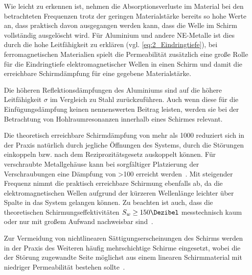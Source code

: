 Wie leicht zu erkennen ist, nehmen die Absorptionsverluste im Material bei den betrachteten Frequenzen trotz der geringen Materialstärke bereits so hohe Werte an, dass praktisch davon ausgegangen werden kann, dass die Welle im Schirm vollständig ausgelöscht wird. Für Aluminium und andere \ac{NE-Metalle} ist dies durch die hohe Leitfähigkeit zu erklären (vgl. \Gleichung\eqref{eq:2_Eindringtiefe}), bei ferromagnetischen Materialien spielt die Permeabilität zusätzlich eine große Rolle für die Eindringtiefe elektromagnetischer Wellen in einen Schirm und damit die erreichbare Schirmdämpfung für eine gegebene Materialstärke. 
\par 
\vspace{\linespace}
Die höheren Reflektionsdämpfungen des Aluminiums sind auf die höhere Leitfähigkeit $\sigma$ im Vergleich zu Stahl zurückzuführen. Auch wenn diese für die Einfügungsdämpfung keinen nennenswerten Beitrag leisten, werden sie bei der Betrachtung von Hohlraumresonanzen innerhalb eines Schirmes relevant. 
\par
\vspace{\linespace}
Die theoretisch erreichbare Schirmdämpfung von mehr als \SI{1000}{\Dezibel} reduziert sich in der Praxis natürlich durch jegliche Öffnungen des Systems, durch die Störungen einkoppeln bzw. nach dem Reziprozitätsgesetz auskoppelt können. Für verschraubte Metallgehäuse kann bei sorgfältiger Platzierung der Verschraubungen eine Dämpfung von >\SI{100}{\Dezibel} erreicht werden~\cite{Design_of_shielded_enclosures}. Mit steigender Frequenz nimmt die praktisch erreichbare Schirmung ebenfalls ab, da die elektromagnetischen Wellen aufgrund der kürzeren Wellenlänge leichter über Spalte in das System gelangen können. Zu beachten ist auch, dass die theoretischen Schirmungseffektivitäten $S_w \geq 150 \si{\Dezibel}$ messtechnisch kaum oder nur mit großem Aufwand nachweisbar sind~\cite{EM_Schirmung}.
\par
\vspace{\linespace}
Zur Vermeidung von nichtlinearen Sättigungserscheinungen des Schirms werden in der Praxis des Weiteren häufig mehrschichtige Schirme eingesetzt, wobei die der Störung zugewandte Seite möglichst aus einem linearen Schirmmaterial mit niedriger Permeabilität bestehen sollte~\cite{EMV}. 



